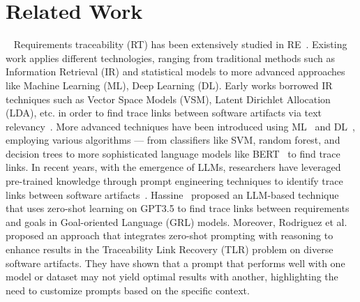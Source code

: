 \section{Related Work}~\label{sec:related}
Requirements traceability (RT) has been extensively studied in RE~\cite{mucha2024systematic,li2023applications,tufail2017systematic,wang2018requirements,ramesh1998factors}. 
Existing work applies different technologies, ranging from traditional methods such as Information Retrieval (IR) and statistical models to more advanced approaches like Machine Learning (ML), Deep Learning (DL). Early works borrowed IR techniques such as Vector Space Models (VSM), Latent Dirichlet Allocation (LDA), etc. in order to find trace links between software artifacts via text relevancy~\cite{gao2022using, guo2017tackling, kuang2017analyzing, nishikawa2015recovering, panichella2013and, Mahmoud2013, Wang20193, sun2017frlink, capobianco2013improving, chhabra2017filtering, bavota2014enhancing, shao2013improved, Wang20191, Li2020,moran2020improving}.
More advanced techniques have been introduced using ML~\cite{Rasiman2022,Bella2019,mills2019tracing,Bella2018,Mills2018,Rath2018,Zhao2018,Mills2017,Mills20172,Falessi2017,Hayes2015,le2015rclinker,li2015recovering} and DL~\cite{kenton2019bert,Zhang2021,Wang20192,Guo:17,Chen2019,Alhoshan2019,Alhoshan2018,Li2018,zhao2020extended,Sultanov2013}, employing various algorithms — from classifiers like SVM, random forest, and decision trees to more sophisticated language models like BERT~\cite{devlin-etal-2019-bert} to find trace links. 
In recent years, with the emergence of LLMs, researchers have leveraged pre-trained knowledge through prompt engineering techniques to identify trace links between software artifacts~\cite{hassine2024llm,rodriguez2023prompts,vogelsang2025impact}. Hassine~\cite{hassine2024llm} proposed an LLM-based technique that uses zero-shot learning on GPT3.5 to find trace links between requirements and goals in Goal-oriented Language (GRL) models. Moreover, Rodriguez et al.~\cite{rodriguez2023prompts} proposed an approach that integrates zero-shot prompting with reasoning to enhance results in the Traceability Link Recovery (TLR) problem on diverse software artifacts.
They have shown that a prompt that performs well with one model or dataset may not yield optimal results with another, highlighting the need to customize prompts based on the specific context.

